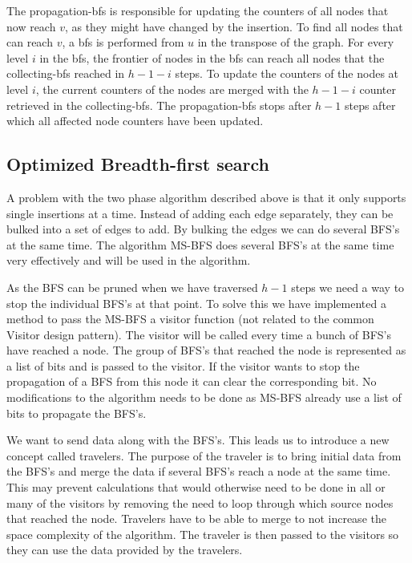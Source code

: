 The propagation-bfs is responsible for updating the counters of all nodes that now reach $v$, as they might have changed by the insertion. To find all nodes that can reach $v$, a bfs is performed from $u$ in the transpose of the graph. For every level $i$ in the bfs, the frontier of nodes in the bfs can reach all nodes that the collecting-bfs reached in $h-1-i$ steps. To update the counters of the nodes at level $i$, the current counters of the nodes are merged with the $h-1-i$ counter retrieved in the collecting-bfs. The propagation-bfs stops after $h-1$ steps after which all affected node counters have been updated.  


\subsection{Optimized Breadth-first search}

A problem with the two phase algorithm described above is that it only supports single insertions at a time. Instead of adding each edge separately, they can be bulked into a set of edges to add. By bulking the edges we can do several BFS's at the same time. The algorithm MS-BFS \cite{msbfs} does several BFS's at the same time very effectively and will be used in the algorithm. 

As the BFS can be pruned when we have traversed $h-1$ steps we need a way to stop the individual BFS's at that point. To solve this we have implemented a method to pass the MS-BFS a visitor function (not related to the common Visitor design pattern). The visitor will be called every time a bunch of BFS's have reached a node. The group of BFS's that reached the node is represented as a list of bits and is passed to the visitor. If the visitor wants to stop the propagation of a BFS from this node it can clear the corresponding bit. No modifications to the algorithm needs to be done as MS-BFS already use a list of bits to propagate the BFS's.

We want to send data along with the BFS's. This leads us to introduce a new concept called travelers. The purpose of the traveler is to bring initial data from the BFS's and merge the data if several BFS's reach a node at the same time. This may prevent calculations that would otherwise need to be done in all or many of the visitors by removing the need to loop through which source nodes that reached the node. Travelers have to be able to merge to not increase the space complexity of the algorithm. The traveler is then passed to the visitors so they can use the data provided by the travelers. 

